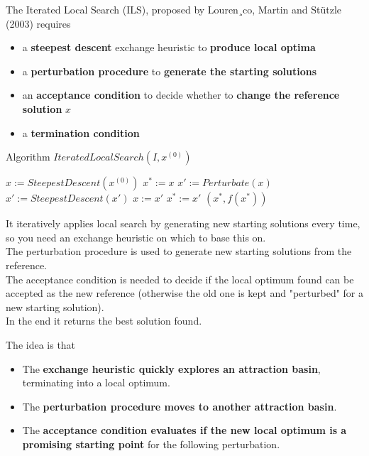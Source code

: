 \documentclass[11pt]{article}
\begin{document}
	The Iterated Local Search (ILS), proposed by Louren¸co, Martin and St\"utzle (2003) requires
	\begin{itemize}
		\item a \textbf{steepest descent} exchange heuristic to \textbf{produce local optima}
		
		\item a \textbf{perturbation procedure} to \textbf{generate the starting solutions}
		
		\item an \textbf{acceptance condition} to decide whether to \textbf{change the reference solution} $x$
		
		\item a \textbf{termination condition}
	\end{itemize}
	
	\begin{algorithm}
		\caption{Algorithm $IteratedLocalSearch(I , x^{(0)})$}
		\begin{algorithmic}
			\STATE $x := SteepestDescent(x^{(0)})$
			\STATE $x^\ast := x$
				\STATE $x' := Perturbate(x)$
				\STATE $x' := SteepestDescent(x')$
					\STATE $x := x'$
				\ENDIF
					\STATE $x^\ast := x'$
				\ENDIF
			\ENDFOR
			\RETURN $(x^\ast, f (x^\ast))$
		\end{algorithmic}
	\end{algorithm}
	
	It iteratively applies local search by generating new starting solutions every time, so you need an exchange heuristic on which to base this on.\\
	
	The perturbation procedure is used to generate new starting solutions from the reference.\\
	
	The acceptance condition is needed to decide if the local optimum found can be accepted as the new reference (otherwise the old one is kept and "perturbed" for a new starting solution).\\
	
	In the end it returns the best solution found.
	
	\newpage
	
	The idea is that
	\begin{itemize}
		\item The \textbf{exchange heuristic quickly explores an attraction basin}, terminating into a local optimum.
		
		\item The \textbf{perturbation procedure moves to another attraction basin}.
		
		\item The \textbf{acceptance condition evaluates if the new local optimum is a promising starting point} for the following perturbation.
	\end{itemize}
	
\end{document}
